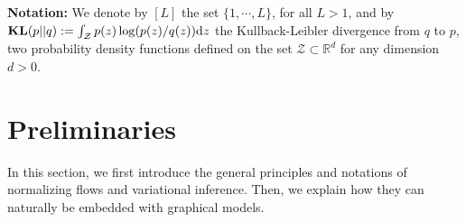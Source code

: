 \documentclass[twoside]{article}
\begin{document}
 \textbf{Notation:} We denote by $[L]$ the set $ \{1, \cdots, L\}$, for all $L >1$, and by $\textbf{\text{KL}}(p || q ) := \int_{\mathcal{Z}} p(z) \log(p(z)/q(z)) \mathrm{d}z$ the Kullback-Leibler divergence from $q$ to $p$, two probability density functions defined on the set $\mathcal{Z} \subset \mathbb{R}^d$ for any dimension $d >0$.

\vspace{-0.05in}
\section{Preliminaries}\label{sec:prelim}
\vspace{-0.05in}
In this section, we first introduce the general principles and notations of normalizing flows and variational inference. 
Then, we explain how they can naturally be embedded with graphical models.
\end{document}
